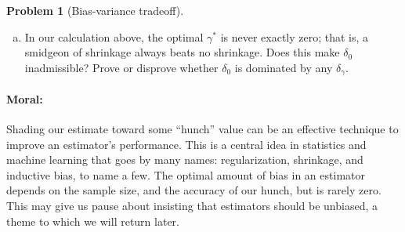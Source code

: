 \documentclass{article}
\theoremstyle{definition}
\newtheorem{problem}{Problem}
\begin{document}
\begin{problem}[Bias-variance tradeoff]
\begin{enumerate}[(a)]
    

  \item In our calculation above, the optimal $\gamma^*$ is never exactly zero; that is, a smidgeon of shrinkage always beats no shrinkage. Does this make $\delta_0$ inadmissible? Prove or disprove whether $\delta_0$ is dominated by any $\delta_\gamma$.

    

  \end{enumerate}

\paragraph{Moral:} Shading our estimate toward some ``hunch'' value can be an effective technique to improve an estimator's performance. This is a central idea in statistics and machine learning that goes by many names: regularization, shrinkage, and inductive bias, to name a few. The optimal amount of bias in an estimator depends on the sample size, and the accuracy of our hunch, but is rarely zero. This may give us pause about insisting that estimators should be unbiased, a theme to which we will return later.

\end{problem}
\end{document}
